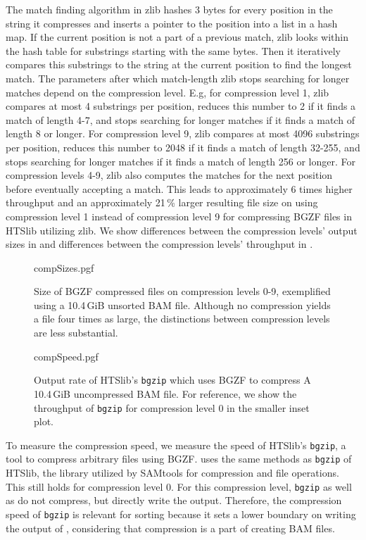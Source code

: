 The match finding algorithm in zlib hashes 3 bytes for every position in the string it compresses and inserts a pointer to the position into a list in a hash map. If the current position is not a part of a previous match, zlib looks within the hash table for substrings starting with the same bytes. Then it iteratively compares this substrings to the string at the current position to find the longest match. The parameters after which match-length zlib stops searching for longer matches depend on the compression level. E.g, for compression level 1, zlib compares at most 4 substrings per position, reduces this number to 2 if it finds a match of length 4-7, and stops searching for longer matches if it finds a match of length 8 or longer. For compression level 9, zlib compares at most 4096 substrings per position, reduces this number to 2048 if it finds a match of length 32-255, and stops searching for longer matches if it finds a match of length 256 or longer. For compression levels 4-9, zlib also computes the matches for the next position before eventually accepting a match. This leads to approximately 6 times higher throughput and an approximately 21\,\% larger resulting file size on using compression level 1 instead of compression level 9 for compressing BGZF files in HTSlib utilizing zlib. We show differences between the compression levels' output sizes in  and differences between the compression levels' throughput in .
\begin{figure}[htb]
        {compSizes.pgf}
    \caption{Size of BGZF compressed files on compression levels 0-9, exemplified using a 10.4\,GiB unsorted BAM file. 
    Although no compression yields a file four times as large, the distinctions between compression levels are less substantial.}
    \label{fig:compSizes}
\end{figure}
\begin{figure}[htb]
        {compSpeed.pgf}
    \caption{Output rate of HTSlib's \texttt{bgzip} which uses BGZF to compress A 10.4\,GiB uncompressed BAM file. For reference, we show the throughput of \texttt{bgzip} for compression level 0 in the smaller inset plot. \points}
    \label{fig:compSpeed}
\end{figure}

To measure the compression speed, we measure the speed of HTSlib's \texttt{bgzip}, a tool to compress arbitrary files using BGZF. \sort uses the same methods as \texttt{bgzip} of HTSlib, the library utilized by SAMtools for compression and file operations. This still holds for compression level 0. For this compression level, \texttt{bgzip} as well as \sort do not compress, but directly write the output. Therefore, the compression speed of \texttt{bgzip} is relevant for sorting because it sets a lower boundary on writing the output of \sort, considering that compression is a part of creating BAM files.

